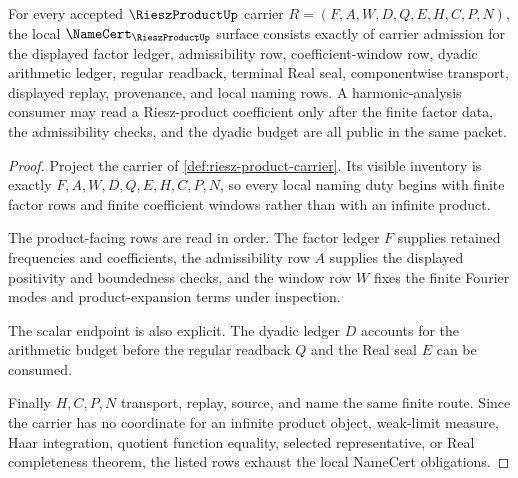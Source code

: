 \begin{theorem}
\label{thm:riesz-product-namecert-obligations}
For every accepted $\RieszProductUp$ carrier $R=(F,A,W,D,Q,E,H,C,P,N)$, the local $\NameCert_{\RieszProductUp}$ surface consists exactly of carrier admission for the displayed factor ledger, admissibility row, coefficient-window row, dyadic arithmetic ledger, regular readback, terminal Real seal, componentwise transport, displayed replay, provenance, and local naming rows. A harmonic-analysis consumer may read a Riesz-product coefficient only after the finite factor data, the admissibility checks, and the dyadic budget are all public in the same packet.
\end{theorem}
\begin{proof}
Project the carrier of \autoref{def:riesz-product-carrier}. Its visible inventory is exactly $F,A,W,D,Q,E,H,C,P,N$, so every local naming duty begins with finite factor rows and finite coefficient windows rather than with an infinite product.

The product-facing rows are read in order. The factor ledger $F$ supplies retained frequencies and coefficients, the admissibility row $A$ supplies the displayed positivity and boundedness checks, and the window row $W$ fixes the finite Fourier modes and product-expansion terms under inspection.

The scalar endpoint is also explicit. The dyadic ledger $D$ accounts for the arithmetic budget before the regular readback $Q$ and the Real seal $E$ can be consumed.

Finally $H,C,P,N$ transport, replay, source, and name the same finite route. Since the carrier has no coordinate for an infinite product object, weak-limit measure, Haar integration, quotient function equality, selected representative, or Real completeness theorem, the listed rows exhaust the local NameCert obligations.
\end{proof}

